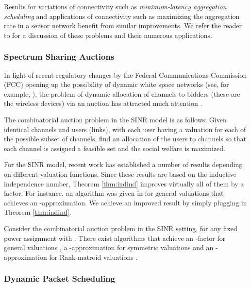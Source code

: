 \documentclass[11pt]{amsart}
\begin{document}
Results for variations of connectivity such as \emph{minimum-latency aggregation scheduling} and applications of connectivity such as maximizing the aggregation rate in a sensor network benefit from similar improvements. We refer the reader to 
\cite{HM12} for a discussion of these problems and their numerous applications.


\subsubsection*{Spectrum Sharing Auctions}
In light of recent regulatory changes by the Federal Communications Commission (FCC) opening up the possibility of dynamic white space networks (see, for example, \cite{DBLP:conf/sigcomm/BahlCMMW09}), the problem of dynamic allocation of channels to bidders (these are the wireless devices) via an auction has 
attracted much attention \cite{Zhou:2008:ESS:1409944.1409947,DBLP:conf/infocom/ZhouZ09}. 

The combinatorial auction problem in the SINR model is as follows: Given  identical channels and  users (links), with each user having a valuation for each of the  possible
subset of channels, find an allocation of the users to channels so that
each channel is assigned a feasible set and the social welfare is maximized.

For the SINR model, recent work \cite{DBLP:conf/spaa/HoeferKV11,DBLP:conf/sigecom/HoeferK12} has established a number of results depending on different valuation functions. Since
these results are based on the inductive independence number, Theorem \ref{thm:indind} improves virtually all of them by a  factor.
For instance, an algorithm was given in \cite{DBLP:conf/spaa/HoeferKV11} for general valuations 
that achieves an -approximation. We achieve an improved result by simply plugging in Theorem \ref{thm:indind}.

\begin{corollary}
Consider the combinatorial auction problem in the SINR setting, for
any fixed power assignment  with .
There exist algorithms that achieve an -factor for
general valuations \cite{DBLP:conf/spaa/HoeferKV11}, a
-approximation for symmetric valuations and an -approximation for Rank-matroid valuations \cite{DBLP:conf/sigecom/HoeferK12}.
\end{corollary}


\subsubsection*{Dynamic Packet Scheduling}
\end{document}
